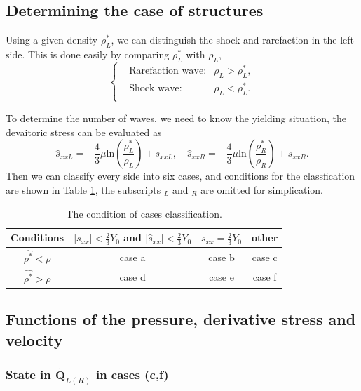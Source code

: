 \documentclass[review]{elsarticle}
\begin{document}
\begin{enumerate}[Step 1]
\subsection{Determining the case of structures} \label{sec:deter}

Using a given density $\rho^*_L$, we can distinguish the shock and rarefaction in the left side.  This is done easily by comparing $\rho^*_L$ with $\rho_L$,
\begin{equation}
  \left\{
  \begin{aligned}
	& \text{Rarefaction wave:} & \rho_L > \rho_L^*,\\
	& \text{Shock wave:} &  \rho_L < \rho_L^*.\\
\end{aligned}\right.
\end{equation}

To determine the number of waves, we need to know the yielding situation,  
the devaitoric stress can be evaluated as 
\begin{equation}  \label{sxx1}
  \hat{s}_{xxL}=-\frac{4}{3}\mu\text{ln}(\frac{\rho_L^*}{\rho_L})+s_{xxL},
\quad
  \hat{s}_{xxR}=-\frac{4}{3}\mu\text{ln}(\frac{\rho_R^*}{\rho_R})+s_{xxR}.
\end{equation}
  Then we can classify every side into six cases, and conditions for the classfication are  shown in Table \ref{tab:cases}, the  subscripts $_L$ and  $_R$  are omitted for simplication. 

\begin{table}
  \centering 
  \caption{The condition of  cases classification.}
  \begin{tabular}{c|ccc}
	\toprule
	Conditions & $|s_{xx}|<\frac{2}{3}Y_0$ and $|\hat{s}_{xx}|<\frac{2}{3}Y_0$ & $s_{xx}=\frac{2}{3}Y_0$&  other\\
  \midrule
  $\hat{\rho^*} <\rho$ & case a& case b& case c \\
  $\hat{\rho^*} >\rho$ & case d& case e& case f \\
  \bottomrule
\end{tabular}
\label{tab:cases}
\end{table}

\subsection{Functions of the pressure, derivative stress and velocity}\label{sec:functions}
\subsubsection{State in $\tilde{\mathbf{Q}}_{L(R)}$ in cases (c,f)}


\end{enumerate}
\end{document}
